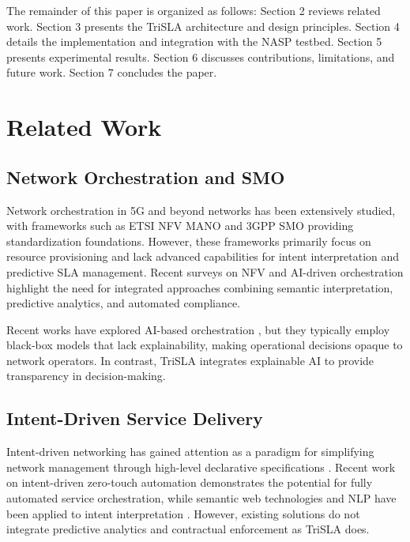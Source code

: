 \documentclass[review]{elsarticle}
\begin{document}
The remainder of this paper is organized as follows: Section 2 reviews related work. Section 3 presents the TriSLA architecture and design principles. Section 4 details the implementation and integration with the NASP testbed. Section 5 presents experimental results. Section 6 discusses contributions, limitations, and future work. Section 7 concludes the paper.

\section{Related Work}

\subsection{Network Orchestration and SMO}

Network orchestration in 5G and beyond networks has been extensively studied, with frameworks such as ETSI NFV MANO \cite{etsi2014} and 3GPP SMO \cite{3gpp2023} providing standardization foundations. However, these frameworks primarily focus on resource provisioning and lack advanced capabilities for intent interpretation and predictive SLA management. Recent surveys on NFV \cite{nfv-survey-2023} and AI-driven orchestration \cite{ai-orch-2023} highlight the need for integrated approaches combining semantic interpretation, predictive analytics, and automated compliance.

Recent works have explored AI-based orchestration \cite{ai-orch-1,ai-orch-2,ai-orch-2023}, but they typically employ black-box models that lack explainability, making operational decisions opaque to network operators. In contrast, TriSLA integrates explainable AI to provide transparency in decision-making.

\subsection{Intent-Driven Service Delivery}

Intent-driven networking has gained attention as a paradigm for simplifying network management through high-level declarative specifications \cite{intent-1,intent-3,intent-2023,zero-touch-2}. Recent work on intent-driven zero-touch automation \cite{intent-2023} demonstrates the potential for fully automated service orchestration, while semantic web technologies and NLP have been applied to intent interpretation \cite{intent-semantic}. However, existing solutions do not integrate predictive analytics and contractual enforcement as TriSLA does.
\end{document}
